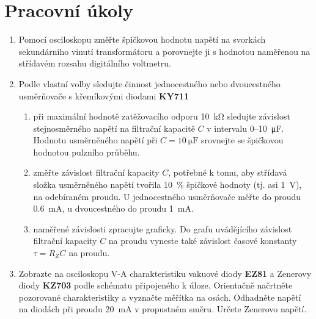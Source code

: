 \documentclass[a4paper]{article}
\author{Vladislav Wohlrath}
\begin{document}
\begin{titlepage}

\end{titlepage}

\section*{Pracovní úkoly}
\begin{enumerate}
\item Pomocí osciloskopu změřte špičkovou hodnotu napětí na svorkách sekundárního vinutí transformátoru a porovnejte ji s hodnotou naměřenou na střídavém rozsahu digitálního voltmetru.
\item Podle vlastní volby sledujte činnost jednocestného nebo dvoucestného usměrňovače s křemíkovými diodami \textbf{KY711}
	\begin{enumerate}
		\item při maximální hodnotě zatěžovacího odporu \SI{10}{\kilo\ohm} sledujte závislost stejnosměrného napětí na filtrační kapacitě $C$ v intervalu 0--\SI{10}{\micro\farad}. Hodnotu usměrněného napětí při $C=\SI{10}{\micro\farad}$ srovnejte se špičkovou hodnotou pulzního průběhu.
		\item změřte závislost filtrační kapacity $C$, potřebné k tomu, aby střídavá složka usměrněného napětí tvořila \SI{10}{\percent} špičkové hodnoty (tj. asi \SI{1}{\volt}), na odebíraném proudu. U jednocestného usměrňovače měřte do proudu \SI{0.6}{\milli\ampere}, u dvoucestného do proudu \SI{1}{\milli\ampere}.
		\item naměřené závislosti zpracujte graficky. Do grafu uvádějícího závislost filtrační kapacity $C$ na proudu vyneste také závislost časové konstanty $\tau=R_Z C$ na proudu.
	\end{enumerate}
\item Zobrazte na osciloskopu V-A charakteristiku vakuové diody \textbf{EZ81} a Zenerovy diody \textbf{KZ703} podle schématu připojeného k úloze. Orientačně načrtněte pozorované charakteristiky a vyznačte měřítka na osách. Odhadněte napětí na diodách při proudu \SI{20}{\milli\ampere} v propustném směru. Určete Zenerovo napětí.
\end{enumerate}










\printbibliography[title={Seznam použité literatury}]
\end{document}
